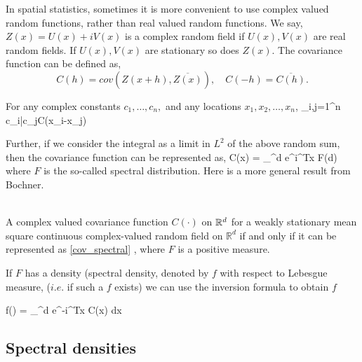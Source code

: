 In spatial statistics, sometimes it is more convenient to use complex valued random functions, rather than real valued random functions. We say, $Z(x)=U(x) + i V(x)$ is a complex random field if $U(x),V(x)$ are real random fields. If $U(x),V(x)$ are stationary so does $Z(x)$. The covariance function can be defined as,
\[
	C(h) = cov(Z(x+h), \overline{Z(x)}), \quad C(-h)=\overline{C(h)}.
\]

For any complex constants $c_1,\ldots, c_n,$ and any locations $x_1, x_2, \ldots, x_n$,
\beq
\sum_{i,j=1}^n c_i\bar{c_j}C(x_i-x_j)
\eeq

Further, if we consider the integral as a limit in $L^2$ of the above random sum, then the covariance function can be represented as,
\beq \label{cov_spectral}
C(x) = \int_{^d} e^{i\omega^Tx} F(d\omega)
\eeq
where $F$ is the so-called spectral distribution. Here is a more general result from Bochner.\\

\begin{theorem}\hfill \\
A complex valued covariance function $C(\cdot)$ on $\mathbb{R}^d$ for a weakly stationary mean square continuous complex-valued random field on $\mathbb{R}^d$ if and only if it can be represented as \eqref{cov_spectral} , where $F$ is a positive measure.
\end{theorem}

If $F$ has a density (spectral density, denoted by $f$ with respect to Lebesgue measure, ($i.e.$ if such a $f$ exists) we can use the inversion formula to obtain $f$


\beq
f(\omega) =   \int_{^d} e^{-i\omega^Tx} C(x) dx
\eeq

\vskip 16pt 
\subsection{\bf Spectral densities}

